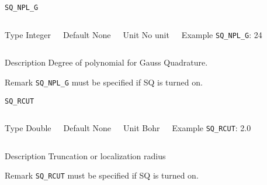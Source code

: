 \begin{frame}[allowframebreaks]{\texttt{SQ\_NPL\_G}} \label{SQ_NPL_G}
\vspace*{-12pt}
\begin{columns}
\begin{block}{Type}
Integer
\end{block}

\begin{block}{Default}
None
\end{block}

\begin{block}{Unit}
No unit
\end{block}

\begin{block}{Example}
\texttt{SQ\_NPL\_G}: 24
\end{block}
\end{columns}

\begin{block}{Description}
Degree of polynomial for Gauss Quadrature.
\end{block}

\begin{block}{Remark}
\texttt{SQ\_NPL\_G} must be specified if SQ is turned on.
\end{block}

\end{frame}




\begin{frame}[allowframebreaks]{\texttt{{SQ\_RCUT}}} \label{SQ_RCUT}
\vspace*{-12pt}
\begin{columns}
\begin{block}{Type}
Double
\end{block}

\begin{block}{Default}
None
\end{block}

\begin{block}{Unit}
Bohr
\end{block}

\begin{block}{Example}
\texttt{SQ\_RCUT}: 2.0
\end{block}
\end{columns}

\begin{block}{Description}
Truncation or localization radius
\end{block}

\begin{block}{Remark}
\texttt{{SQ\_RCUT}} must be specified if SQ is turned on.
\end{block}
\end{frame}


